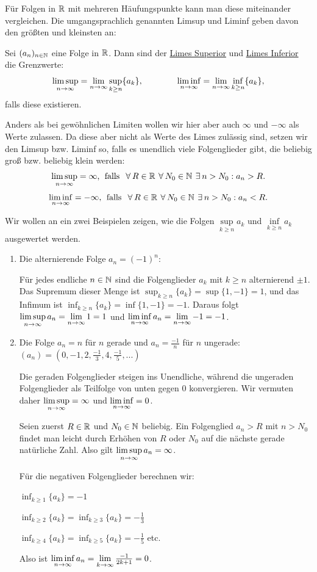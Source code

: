 Für Folgen in $\mathbb{R}$ mit mehreren Häufungspunkte kann man diese miteinander vergleichen. Die umgangsprachlich genannten Limsup und Liminf geben davon den größten und kleinsten an:

\begin{definition}
    Sei $(a_n)_{n \in \mathbb{N}}$ eine Folge in $\mathbb{R}$. Dann sind der \underline{Limes Superior} und \underline{Limes Inferior} die Grenzwerte:
    $$\limsup\limits_{n \rightarrow \infty} = \lim\limits_{n \rightarrow \infty} \sup\limits_{k \geq n} \{a_k\}, \qquad \qquad \liminf\limits_{n \rightarrow \infty} = \lim\limits_{n \rightarrow \infty} \inf\limits_{k \geq n} \{a_k\},$$
    falls diese existieren.
    
    Anders als bei gewöhnlichen Limiten wollen wir hier aber auch $\infty$ und $-\infty$ als Werte zulassen. Da diese aber nicht als Werte des Limes zulässig sind, setzen wir den Limsup bzw. Liminf so, falls es unendlich viele Folgenglieder gibt, die beliebig groß bzw. beliebig klein werden:
    $$\limmsup = \infty \text{,\; falls } \forall R \in \R \forall N_0 \in \N \exists n > N_0: a_n > R.$$
    $$\limminf = -\infty \text{,\; falls } \forall R \in \R \forall N_0 \in \N \exists n > N_0: a_n < R.$$
\end{definition}

\begin{example}
    Wir wollen an ein zwei Beispielen zeigen, wie die Folgen $\sup\limits_{k \geq n} a_k$ und $\inf\limits_{k \geq n} a_k$ ausgewertet werden.
    \begin{enumerate}
        \item Die alternierende Folge $a_n = (-1)^n$:
        
        Für jedes endliche $n \in \mathbb{N}$ sind die Folgenglieder $a_k$ mit $k \geq n$ alternierend $\pm 1$. Das Supremum dieser Menge ist $\sup_{k \geq n} \{a_k\} = \sup \{1, -1\} = 1$, und das Infimum ist $\inf_{k \geq n} \{a_k\} = \inf \{1, -1\} = -1$. Daraus folgt $\limsup\limits_{n \rightarrow \infty} a_n = \lim\limits_{n \rightarrow \infty} 1 = 1$ und $\liminf\limits_{n \rightarrow \infty} a_n = \lim\limits_{n \rightarrow \infty} -1 = -1$.
        \item Die Folge $a_n = n$ für $n$ gerade und $a_n = \frac{-1}{n}$ für $n$ ungerade: $(a_n) = (0, -1, 2, \frac{-1}{3}, 4, \frac{-1}{5}, ...)$
        
        Die geraden Folgenglieder steigen ins Unendliche, während die ungeraden Folgenglieder als Teilfolge von unten gegen $0$ konvergieren. Wir vermuten daher $\limsup\limits_{n \rightarrow \infty} = \infty$ und $\liminf\limits_{n \rightarrow \infty} = 0$.

        Seien zuerst $R \in \mathbb{R}$ und $N_0 \in \mathbb{N}$ beliebig. Ein Folgenglied $a_n > R$ mit $n > N_0$ findet man leicht durch Erhöhen von $R$ oder $N_0$ auf die nächste gerade natürliche Zahl. Also gilt $\limsup\limits_{n \rightarrow \infty} a_n = \infty$.

        Für die negativen Folgenglieder berechnen wir:

        $\inf_{k \geq 1} \{a_k\} = -1$

        $\inf_{k \geq 2} \{a_k\} = \inf_{k \geq 3} \{a_k\} = -\frac{1}{3}$

        $\inf_{k \geq 4} \{a_k\} = \inf_{k \geq 5} \{a_k\} = -\frac{1}{5}$ etc.

        Also ist $\liminf\limits_{n \rightarrow \infty} a_n = \lim\limits_{k \rightarrow \infty} \frac{-1}{2k+1} = 0$.
    \end{enumerate}
\end{example}

